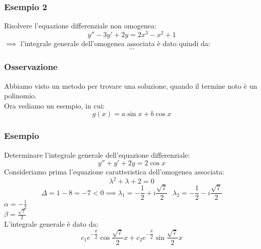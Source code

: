 \documentclass[../../main.tex]{subfiles}
\begin{document}
\subsubsection{Esempio 2}
Risolvere l'equazione differenziale non omogenea:
\[
    y'' - 3y' + 2y = 2x^3 - x^2 + 1
\]
$\implies$ l'integrale generale dell'omogenea associata è dato quindi da:
\[
    \ldots
\]

\subsubsection{Osservazione}
Abbiamo visto un metodo per trovare una soluzione, quando il termine noto è un
polinomio. \\ Ora vediamo un esempio, in cui:
\[
    g(x) = a\sin{x} + b\cos{x}
\]
\subsubsection{Esempio}
Determinare l'integrale generale dell'equazione differenziale:
\[
    y'' + y' + 2y = 2\cos{x}
\]
Consideriamo prima l'equazione caratteristica dell'omogenea associata:
\[
    \lambda^2 + \lambda + 2 = 0
\]
\[
    \Delta = 1 - 8 = -7 < 0 \implies \lambda_1 = -\frac{1}{2} + i\frac{\sqrt{7}}{2} \ \ \ \lambda_2 = -\frac{1}{2} - i\frac{\sqrt{7}}{2}
\]
$\alpha = -\frac{1}{2}$\\ $\beta = \frac{\sqrt{7}}{2}$\\
L'integrale generale è dato da:
\[
    c_1e^{-\dfrac{x}{2}}\cos{\frac{\sqrt{7}}{2}x} + c_2e^{-\dfrac{x}{2}}\sin{\frac{\sqrt{7}}{2}x}
\]
\end{document}
